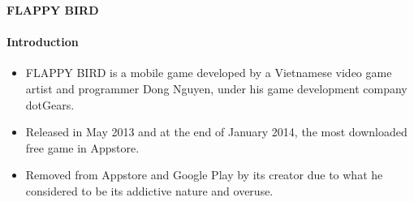\documentclass[10pt]{beamer}
\begin{document}
{
%
\begin{frame}{\textbf{FLAPPY BIRD}}
    \framesubtitle{\textbf{Introduction}}
\begin{itemize}
\item FLAPPY BIRD is a mobile game developed by a Vietnamese video game artist and programmer 
    Dong Nguyen, under his game development company dotGears.
    \pause
\item Released in May 2013 and at the end of January 2014, the most downloaded free game in Appstore.
\pause
\item Removed from Appstore and Google Play by its creator due to what he considered to be its addictive nature and overuse.
\end{itemize}
\vspace{4cm}
\end{frame}
}
\end{document}
